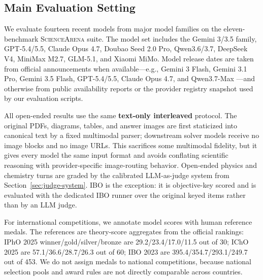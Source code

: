\documentclass[11pt]{article}
\begin{document}
\subsection{Main Evaluation Setting}
We evaluate fourteen recent models from major model families on the eleven-benchmark \textsc{ScienceArena} suite.
The model set includes the Gemini 3/3.5 family, GPT-5.4/5.5, Claude Opus 4.7, Doubao Seed 2.0 Pro, Qwen3.6/3.7, DeepSeek V4, MiniMax M2.7, GLM-5.1, and Xiaomi MiMo.
Model release dates are taken from official announcements when available---e.g., Gemini 3 Flash, Gemini 3.1 Pro, Gemini 3.5 Flash, GPT-5.4/5.5, Claude Opus 4.7, and Qwen3.7-Max \citep{google_gemini3flash_release_2025,google_gemini31_release_2026,google_gemini35_release_2026,openai_gpt54_release_2026,openai_gpt55_release_2026,anthropic_opus47_release_2026,qwen37_release_2026}---and otherwise from public availability reports or the provider registry snapshot used by our evaluation scripts.

All open-ended results use the same \textbf{text-only interleaved} protocol.
The original PDFs, diagrams, tables, and answer images are first staticized into canonical text by a fixed multimodal parser; downstream solver models receive no image blocks and no image URLs.
This sacrifices some multimodal fidelity, but it gives every model the same input format and avoids conflating scientific reasoning with provider-specific image-routing behavior.
Open-ended physics and chemistry turns are graded by the calibrated LLM-as-judge system from Section~\ref{sec:judge-system}.
IBO is the exception: it is objective-key scored and is evaluated with the dedicated IBO runner over the original keyed items rather than by an LLM judge.

For international competitions, we annotate model scores with human reference medals.
The references are theory-score aggregates from the official rankings: IPhO 2025 winner/gold/silver/bronze are 29.2/23.4/17.0/11.5 out of 30; IChO 2025 are 57.1/36.6/28.7/26.3 out of 60; IBO 2023 are 395.4/354.7/293.1/249.7 out of 453.
We do not assign medals to national competitions, because national selection pools and award rules are not directly comparable across countries.
\end{document}
